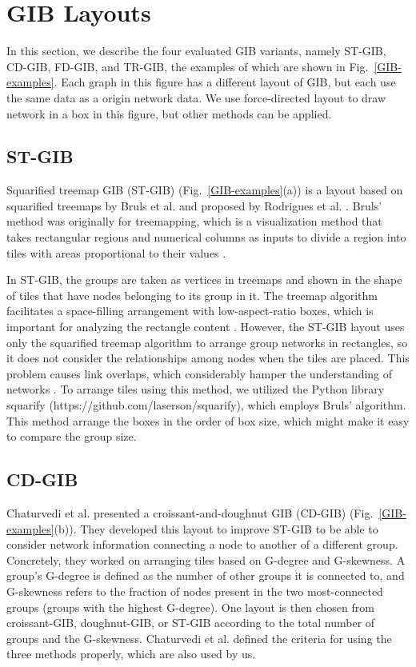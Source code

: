 \documentclass{vgtc}                          %
\begin{document}
\section{GIB Layouts}
In this section, we describe the four evaluated GIB variants, namely ST-GIB, CD-GIB, FD-GIB, and TR-GIB, the examples of which are shown in Fig.~\ref{GIB-examples}.
Each graph in this figure has a different layout of GIB, but each use the same data as a origin network data.
We use force-directed layout to draw network in a box in this figure, but other methods can be applied.

\subsection{ST-GIB}
Squarified treemap GIB (ST-GIB) (Fig.~\ref{GIB-examples}(a)) is a layout based on squarified treemaps by Bruls et al. \cite{bruls2000squarified} and proposed by Rodrigues et al. \cite{rodrigues2011group}.
Bruls' method was originally for treemapping, which is a visualization method that takes rectangular regions and numerical columns as inputs to divide a region into tiles with areas proportional to their values \cite{shneiderman1992tree}.

In ST-GIB, the groups are taken as vertices in treemaps and shown in the shape of tiles that have nodes belonging to its group in it.
The treemap algorithm facilitates a space-filling arrangement with low-aspect-ratio boxes, which is important for analyzing the rectangle content \cite{bruls2000squarified}.
However, the ST-GIB layout uses only the squarified treemap algorithm to arrange group networks in rectangles, so it does not consider the relationships among nodes when the tiles are placed.
This problem causes link overlaps, which considerably hamper the understanding of networks \cite{468391,purchase1997aesthetic,purchase1998performance,purchase2002empirical}.
To arrange tiles using this method, we utilized the Python library squarify (https://github.com/laserson/squarify), which employs Bruls' algorithm. This method arrange the boxes in the order of box size, which might make it easy to compare the group size.

\subsection{CD-GIB}
Chaturvedi et al. \cite{chaturvedi2014group} presented a croissant-and-doughnut GIB (CD-GIB) (Fig.~\ref{GIB-examples}(b)).
They developed this layout to improve ST-GIB to be able to consider network information connecting a node to another of a different group.
Concretely, they worked on arranging tiles based on G-degree and G-skewness.
A group's G-degree is defined as the number of other groups it is connected to, and G-skewness refers to the fraction of nodes present in the two most-connected groups (groups with the highest G-degree).
One layout is then chosen from croissant-GIB, doughnut-GIB, or ST-GIB according to the total number of groups and the G-skewness.
Chaturvedi et al. defined the criteria for using the three methods properly, which are also used by us.
\end{document}
